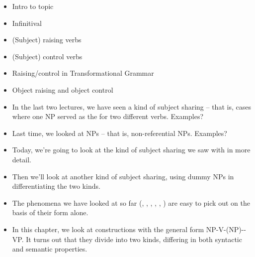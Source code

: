 \documentclass[a4paper,landscape,headrule,footrule]{foils}
\begin{document}
\maketitle

%



\begin{itemize}
\item Intro to topic
\item Infinitival 
\item (Subject) raising verbs
\item (Subject) control verbs
\item Raising/control in Transformational Grammar
\item Object raising and object control
\end{itemize}


\begin{itemize}
\item In the last two lectures, we have seen a kind of 
subject sharing -- that is, cases where one NP 
served as the  for two different verbs.  
Examples?
\item Last time, we looked at  NPs --  that is, 
non-referential NPs.  Examples?
\item Today, we’re going to look at the kind of subject 
sharing we saw with  in more detail.
\item Then we’ll look at another kind of subject 
sharing, using dummy NPs in differentiating the 
two kinds.
\end{itemize}


\begin{itemize}
\item The phenomena we have looked at so far (,
  , , ,
  , ) are easy to pick out on the
  basis of their form alone.
\item In this chapter, we look at constructions with the general form
  NP-V-(NP)--VP.  It turns out that they divide into two
  kinds, differing in both syntactic and semantic properties.
\end{itemize}
\end{document}
